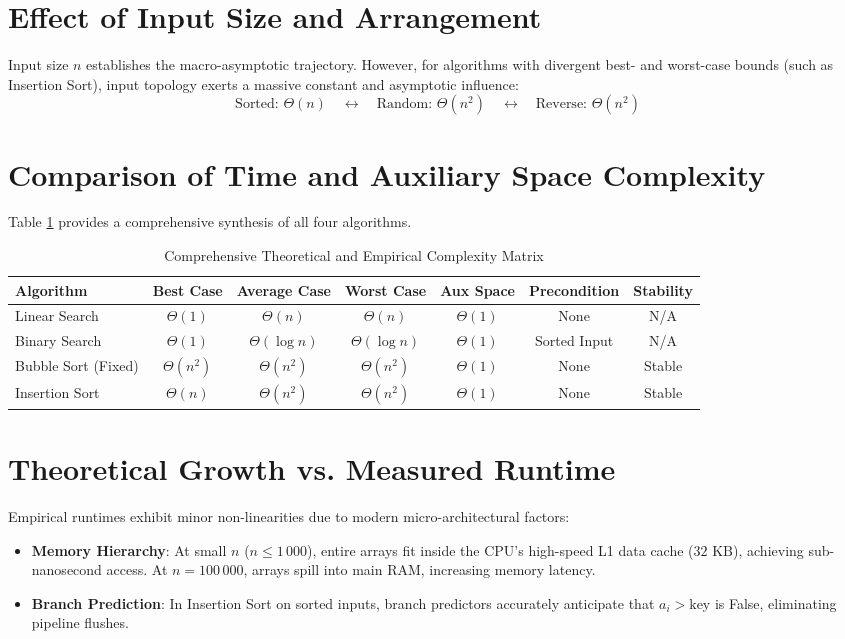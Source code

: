 \documentclass[11pt,a4paper,oneside]{report}
\theoremstyle{definition}
\begin{document}
\section{Effect of Input Size and Arrangement}
Input size $n$ establishes the macro-asymptotic trajectory. However, for algorithms with divergent best- and worst-case bounds (such as Insertion Sort), input topology exerts a massive constant and asymptotic influence:
$$\text{Sorted: } \Theta(n) \quad \longleftrightarrow \quad \text{Random: } \Theta(n^2) \quad \longleftrightarrow \quad \text{Reverse: } \Theta(n^2)$$

\section{Comparison of Time and Auxiliary Space Complexity}
Table \ref{tab:complexity_comparison_matrix} provides a comprehensive synthesis of all four algorithms.

\begin{table}[htbp]
\centering
\caption{Comprehensive Theoretical and Empirical Complexity Matrix}
\label{tab:complexity_comparison_matrix}
\small
\begin{tabular*}{\textwidth}{@{\extracolsep{\fill}}lcccccc}
\toprule
\textbf{Algorithm} & \textbf{Best Case} & \textbf{Average Case} & \textbf{Worst Case} & \textbf{Aux Space} & \textbf{Precondition} & \textbf{Stability} \\
\midrule
Linear Search & $\Theta(1)$ & $\Theta(n)$ & $\Theta(n)$ & $\Theta(1)$ & None & N/A \\
Binary Search & $\Theta(1)$ & $\Theta(\log n)$ & $\Theta(\log n)$ & $\Theta(1)$ & Sorted Input & N/A \\
Bubble Sort (Fixed) & $\Theta(n^2)$ & $\Theta(n^2)$ & $\Theta(n^2)$ & $\Theta(1)$ & None & Stable \\
Insertion Sort & $\Theta(n)$ & $\Theta(n^2)$ & $\Theta(n^2)$ & $\Theta(1)$ & None & Stable \\
\bottomrule
\end{tabular*}
\end{table}

\section{Theoretical Growth vs. Measured Runtime}
Empirical runtimes exhibit minor non-linearities due to modern micro-architectural factors:
\begin{itemize}
    \item \textbf{Memory Hierarchy}: At small $n$ ($n \le 1\,000$), entire arrays fit inside the CPU's high-speed L1 data cache ($32\text{ KB}$), achieving sub-nanosecond access. At $n = 100\,000$, arrays spill into main RAM, increasing memory latency.
    \item \textbf{Branch Prediction}: In Insertion Sort on sorted inputs, branch predictors accurately anticipate that $a_i > \text{key}$ is False, eliminating pipeline flushes.
\end{itemize}
\end{document}
